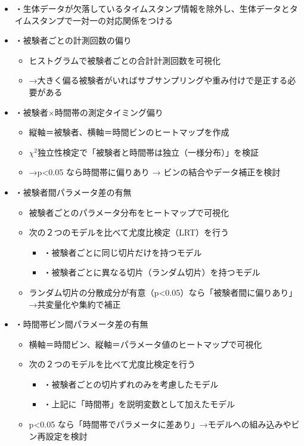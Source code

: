 \documentclass[a4paper,11pt]{article}
\begin{document}
\begin{itemize}
  \item ・生体データが欠落しているタイムスタンプ情報を除外し、生体データとタイムスタンプで一対一の対応関係をつける

  \item ・被験者ごとの計測回数の偏り
    \begin{itemize}
      \item ヒストグラムで被験者ごとの合計計測回数を可視化
      \item →大きく偏る被験者がいればサブサンプリングや重み付けで是正する必要がある
    \end{itemize}

  \item ・被験者×時間帯の測定タイミング偏り
    \begin{itemize}
      \item 縦軸＝被験者、横軸＝時間ビンのヒートマップを作成
      \item $\chi^2$独立性検定で「被験者と時間帯は独立（一様分布）」を検証
      \item →p<0.05 なら時間帯に偏りあり → ビンの結合やデータ補正を検討
    \end{itemize}

  \item ・被験者間パラメータ差の有無
    \begin{itemize}
      \item 被験者ごとのパラメータ分布をヒートマップで可視化
      \item 次の２つのモデルを比べて尤度比検定（LRT）を行う
        \begin{itemize}
          \item ・被験者ごとに同じ切片だけを持つモデル
          \item ・被験者ごとに異なる切片（ランダム切片）を持つモデル
        \end{itemize}
      \item ランダム切片の分散成分が有意（p<0.05）なら「被験者間に偏りあり」→共変量化や集約で補正
    \end{itemize}

  \item ・時間帯ビン間パラメータ差の有無
    \begin{itemize}
      \item 横軸＝時間ビン、縦軸＝パラメータ値のヒートマップで可視化
      \item 次の２つのモデルを比べて尤度比検定を行う
        \begin{itemize}
          \item ・被験者ごとの切片ずれのみを考慮したモデル
          \item ・上記に「時間帯」を説明変数として加えたモデル
        \end{itemize}
      \item p<0.05 なら「時間帯でパラメータに差あり」→モデルへの組み込みやビン再設定を検討
    \end{itemize}


\end{itemize}
\end{document}
